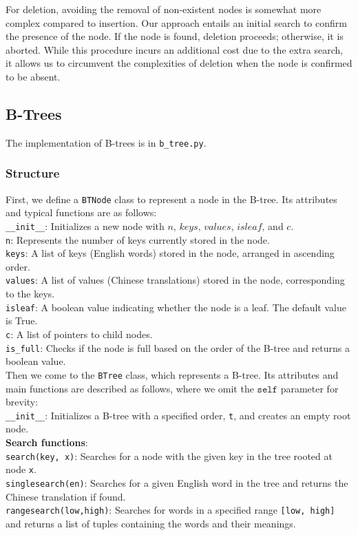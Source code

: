 \documentclass[UTF8]{ctexart}
\begin{document}
For deletion, avoiding the removal of non-existent nodes is somewhat more complex compared to insertion. Our approach entails an initial search to confirm the presence of the node. If the node is found, deletion proceeds; otherwise, it is aborted. While this procedure incurs an additional cost due to the extra search, it allows us to circumvent the complexities of deletion when the node is confirmed to be absent.

\subsection{B-Trees}
The implementation of B-trees is in \texttt{b\_tree.py}.

\subsubsection*{Structure}
First, we define a \texttt{BTNode} class to represent a node in the B-tree. Its attributes and typical functions are as follows:\\

\texttt{\_\_init\_\_}: Initializes a new node with $\textit{n, keys, values, isleaf,}$ and $\textit{c}$.\\
\texttt{n}: Represents the number of keys currently stored in the node.\\
\texttt{keys}: A list of keys (English words) stored in the node, arranged in ascending order.\\
\texttt{values}: A list of values (Chinese translations) stored in the node, corresponding to the keys.\\
\texttt{isleaf}: A boolean value indicating whether the node is a leaf. The default value is True.\\
\texttt{c}: A list of pointers to child nodes.\\
\texttt{is\_full}: Checks if the node is full based on the order of the B-tree and returns a boolean value.\\

Then we come to the \texttt{BTree} class, which represents a B-tree. Its attributes and main functions are described as follows, where we omit the $\texttt{self}$ parameter for brevity:\\
\texttt{\_\_init\_\_}: Initializes a B-tree with a specified order, \texttt{t}, and creates an empty root node.\\

\textbf{Search functions}:\\
\texttt{search(key, x)}: Searches for a node with the given key in the tree rooted at node \texttt{x}.\\
\texttt{singlesearch(en)}: Searches for a given English word in the tree and returns the Chinese translation if found.\\
\texttt{rangesearch(low,high)}: Searches for words in a specified range \texttt{[low, high]} and returns a list of tuples containing the words and their meanings.\\
\end{document}
